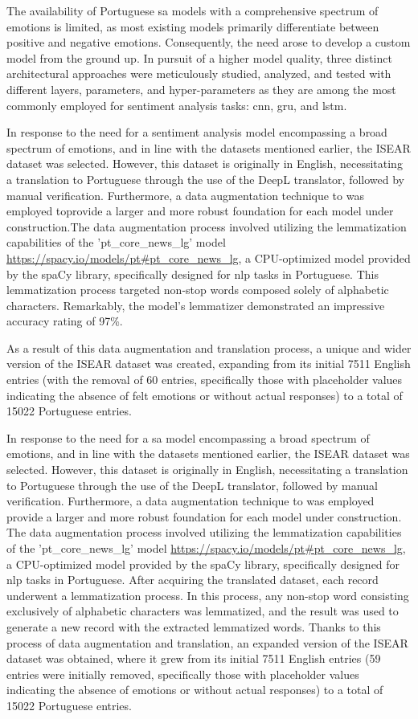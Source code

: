 \documentclass[a4paper,fleqn]{cas-sc}
\begin{document}
The availability of Portuguese \gls{sa} models with a comprehensive spectrum of emotions is limited, as most existing models primarily differentiate between positive and negative emotions.
Consequently, the need arose to develop a custom model from the ground up. In pursuit of a higher model quality, three distinct architectural approaches were meticulously studied, analyzed, and tested with different layers, parameters, and hyper-parameters as they are among the most commonly employed for sentiment analysis tasks: \gls{cnn}, \gls{gru}, and \gls{lstm}. 

In response to the need for a sentiment analysis model encompassing a broad spectrum of emotions, and in line with the datasets mentioned earlier, the ISEAR dataset \cite{ISEAR} was selected. However, this dataset is originally in English, necessitating a translation to Portuguese through the use of the DeepL translator, followed by manual verification. Furthermore, a data augmentation technique to was employed toprovide a larger and more robust foundation for each model under construction.The data augmentation process involved utilizing the lemmatization capabilities of the 'pt\_core\_news\_lg' model \url{https://spacy.io/models/pt#pt_core_news_lg}, a CPU-optimized model provided by the spaCy library, specifically designed for \gls{nlp} tasks in Portuguese. This lemmatization process targeted non-stop words composed solely of alphabetic characters. Remarkably, the model's lemmatizer demonstrated an impressive accuracy rating of 97\%. 

As a result of this data augmentation and translation process, a unique and wider version of the ISEAR dataset was created, expanding from its initial 7511 English entries (with the removal of 60 entries, specifically those with placeholder values indicating the absence of felt emotions or without actual responses) to a total of 15022 Portuguese entries.

In response to the need for a \gls{sa} model encompassing a broad spectrum of emotions, and in line with the datasets mentioned earlier, the ISEAR dataset was selected. However, this dataset is originally in English, necessitating a translation to Portuguese through the use of the DeepL translator, followed by manual verification. Furthermore, a data augmentation technique to was employed provide a larger and more robust foundation for each model under construction. The data augmentation process involved utilizing the lemmatization capabilities of the 'pt\_core\_news\_lg' model \url{https://spacy.io/models/pt#pt_core_news_lg}, a CPU-optimized model provided by the spaCy library, specifically designed for \gls{nlp} tasks in Portuguese. After acquiring the translated dataset, each record underwent a lemmatization process. In this process, any non-stop word consisting exclusively of alphabetic characters was lemmatized, and the result was used to generate a new record with the extracted lemmatized words. Thanks to this process of data augmentation and translation, an expanded version of the ISEAR dataset was obtained, where it grew from its initial 7511 English entries (59 entries were initially removed, specifically those with placeholder values indicating the absence of emotions or without actual responses) to a total of 15022 Portuguese entries.
\end{document}

